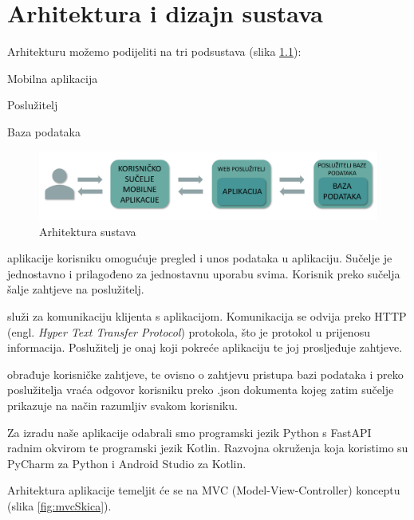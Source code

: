\chapter{Arhitektura i dizajn sustava}
		
		
		Arhitekturu možemo podijeliti na tri podsustava (slika \ref{fig:arhitekturaSkica}):

		\begin{packed_item}
			\item  Mobilna aplikacija
			\item  Poslužitelj
			\item  Baza podataka
		\end{packed_item}

		\begin{figure}[H]
			\includegraphics[scale=0.63]{slike/arhitektura.PNG} %
			\centering
			\caption{Arhitektura sustava}
			\label{fig:arhitekturaSkica}
		\end{figure}
	
		\textit{} aplikacije korisniku omogućuje pregled i unos podataka u aplikaciju. Sučelje je jednostavno i prilagođeno za jednostavnu uporabu svima. Korisnik preko sučelja šalje zahtjeve na poslužitelj.

		\textit{} služi za komunikaciju klijenta s aplikacijom. Komunikacija se odvija preko HTTP (engl. \textit{Hyper Text Transfer Protocol}) protokola, što je protokol u prijenosu informacija. Poslužitelj je onaj koji pokreće aplikaciju te joj prosljeđuje zahtjeve.

		\textit{} obrađuje korisničke zahtjeve, te ovisno o zahtjevu pristupa bazi podataka i preko poslužitelja vraća odgovor korisniku preko .json dokumenta kojeg zatim sučelje prikazuje na način razumljiv svakom korisniku.

		Za izradu naše aplikacije odabrali smo programski jezik Python s FastAPI radnim okvirom te programski jezik Kotlin. Razvojna okruženja koja koristimo su PyCharm za Python i Android Studio za Kotlin.

		Arhitektura aplikacije temeljit će se na MVC (Model-View-Controller) konceptu (slika \ref{fig:mvcSkica}).

